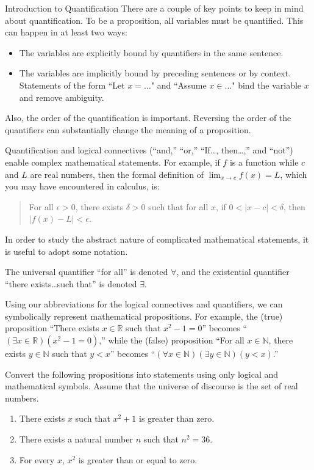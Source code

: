 \begin{section}{Introduction to Quantification}
There are a couple of key points to keep in mind about quantification. To be a proposition, all variables must be quantified.  This can happen in at least two ways:
\begin{itemize}
\item The variables are explicitly bound by quantifiers in the same sentence.
\item The variables are implicitly bound by preceding sentences or by context. Statements of the form ``Let $x=\ldots$" and ``Assume $x\in\ldots$" bind the variable $x$ and remove ambiguity.
\end{itemize}
Also, the order of the quantification is important.  Reversing the order of the quantifiers can substantially change the meaning of a proposition.

Quantification and logical connectives (``and,'' ``or,'' ``If\ldots, then\ldots,'' and ``not'') enable complex mathematical statements. For example, if $f$ is a function while $c$ and $L$ are real numbers, then the formal definition of $\lim_{x\to c}f(x)=L$, which you may have encountered in calculus, is:
\begin{quote}
For all $\epsilon >0$, there exists $\delta >0$ such that for all $x$, if $0<|x-c|<\delta$, then $|f(x)-L|<\epsilon$.
\end{quote}

In order to study the abstract nature of complicated mathematical statements, it is useful to adopt some notation.

\begin{definition}\label{def:quantifiers}
The universal quantifier ``for all'' is denoted $\boxed{\forall}$, and the existential quantifier  ``there exists\ldots such that'' is denoted $\boxed{\exists}$.
\end{definition}

Using our abbreviations for the logical connectives and quantifiers, we can symbolically represent mathematical propositions. For example, the (true) proposition ``There exists $x \in \mathbb{R}$ such that $x^2-1=0$'' becomes ``$(\exists x \in \mathbb{R})(x^2-1=0)$,'' while the (false) proposition ``For all $x\in \mathbb{N}$, there exists $y\in\mathbb{N}$ such that $y<x$'' becomes ``$(\forall x\in\mathbb{N})(\exists y\in\mathbb{N})(y<x)$.'' %

\begin{problem}
Convert the following propositions into statements using only logical and mathematical symbols.  Assume that the universe of discourse is the set of real numbers.
\begin{enumerate}[label=\textrm{(\alph*)}]
\item There exists $x$ such that $x^2+1$ is greater than zero.
\item There exists a natural number $n$ such that $n^2=36$. 
\item For every $x$, $x^2$ is greater than or equal to zero.
\end{enumerate}
\end{problem}


\end{section}
